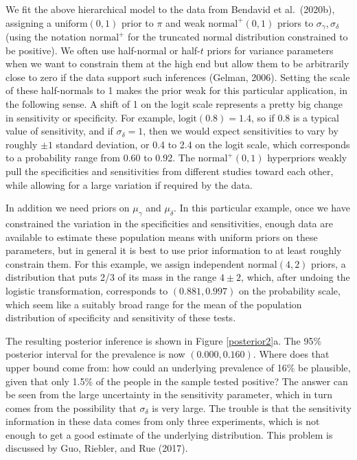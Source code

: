 \documentclass[11pt]{article}
\begin{document}
We fit the above hierarchical model to the data from Bendavid et al.\
(2020b), assigning a $\mbox{uniform}(0,1)$ prior to $\pi$ and weak
$\mbox{normal}^+(0,1)$ priors to $\sigma_{\gamma},\sigma_{\delta}$
(using the notation $\mbox{normal}^+$ for the truncated normal
distribution constrained to be positive).  We often use half-normal or
half-$t$ priors for variance parameters when we want to constrain them
at the high end but allow them to be arbitrarily close to zero if the
data support such inferences (Gelman, 2006).  Setting the scale of
these half-normals to 1 makes the prior weak for this particular
application, in the following sense. A shift of 1 on the logit scale
represents a pretty big change in sensitivity or specificity.  For
example, $\mbox{logit}(0.8)=1.4$, so if 0.8 is a typical value of
sensitivity, and if $\sigma_{\delta}=1$, then we would expect
sensitivities to vary by roughly $\pm 1$ standard
deviation, or 0.4 to 2.4 on the logit scale,
which corresponds to a probability range from 0.60 to 0.92.  The
$\mbox{normal}^+(0,1)$ hyperpriors weakly pull the specificities and
sensitivities from different studies toward each other, while allowing
for a large variation if required by the data.

In addition we need priors on $\mu_{\gamma}$ and $\mu_{\delta}$.  In
this particular example, once we have constrained the variation in the
specificities and sensitivities, enough data are available to estimate
these population means with uniform priors on these parameters, but in
general it is best to use prior information to at least roughly
constrain them.  For this example, we assign independent
$\mbox{normal}(4,2)$ priors, a distribution that puts 2/3 of its mass
in the range $4\pm 2$, which, after undoing the logistic
transformation, corresponds to $(0.881, 0.997)$ on the probability
scale, which seem like a suitably broad range for the mean of the
population distribution of specificity and sensitivity of these tests.

The resulting posterior inference is shown in Figure
\ref{posterior2}a.  The 95\% posterior interval for the prevalence is
now $(0.000, 0.160)$.  Where does that upper bound come from: how could
an underlying prevalence of 16\% be plausible, given that only 1.5\% of
the people in the sample tested positive?  The answer can be seen from
the large uncertainty in the sensitivity parameter, which in turn
comes from the possibility that $\sigma_{\delta}$ is very large.  The
trouble is that the sensitivity information in these data comes from
only three experiments, which is not enough to get a good estimate of
the underlying distribution.  This problem is discussed by Guo,
Riebler, and Rue (2017).
\end{document}
